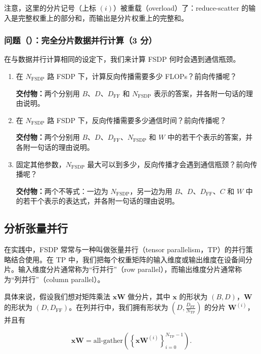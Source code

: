 注意，这里的分片记号（上标 $(i)$）被重载（overload）了：reduce-scatter 的输入是完整权重上的部分和，而输出是分片权重上的完整和。

\subsubsection*{问题（）：完全分片数据并行计算（3 分）}

在与数据并行计算相同的设定下，我们来计算 FSDP 何时会遇到通信瓶颈。

\begin{enumerate}[label=(\alph*)]
  \item 在 $N_{\mathrm{FSDP}}$ 路 FSDP 下，计算反向传播需要多少 FLOPs？前向传播呢？

  \textbf{交付物：}两个分别用 $B$、$D$、$D_{\mathrm{FF}}$ 和 $N_{\mathrm{FSDP}}$ 表示的答案，并各附一句话的理由说明。

  \item 在 $N_{\mathrm{FSDP}}$ 路 FSDP 下，反向传播需要多少通信时间？前向传播呢？

  \textbf{交付物：}两个分别用 $B$、$D$、$D_{\mathrm{FF}}$、$N_{\mathrm{FSDP}}$ 和 $W$ 中的若干个表示的答案，并各附一句话的理由说明。

  \item 固定其他参数，$N_{\mathrm{FSDP}}$ 最大可以到多少，反向传播才会遇到通信瓶颈？前向传播呢？

  \textbf{交付物：}两个不等式：一边为 $N_{\mathrm{FSDP}}$，另一边为用 $B$、$D$、$D_{\mathrm{FF}}$、$C$ 和 $W$ 中的若干个表示的表达式，并各附一句话的理由说明。
\end{enumerate}

\subsection{分析张量并行}

在实践中，FSDP 常常与一种叫做张量并行（tensor parallelism，TP）的并行策略结合使用。在 TP 中，我们把每个权重矩阵的输入维度或输出维度在设备间分片。输入维度分片通常称为“行并行”（row parallel），而输出维度分片通常称为“列并行”（column parallel）。

具体来说，假设我们想对矩阵乘法 $\boldsymbol{x}\boldsymbol{W}$ 做分片，其中 $\boldsymbol{x}$ 的形状为 $(B,D)$，$\boldsymbol{W}$ 的形状为 $(D,D_{\mathrm{FF}})$。在列并行中，我们拥有形状为 $\left(D,\frac{D_{\mathrm{FF}}}{N_{\mathrm{TP}}}\right)$ 的分片 $\boldsymbol{W}^{(i)}$，并且有

\begin{equation}
\boldsymbol{x}\boldsymbol{W} = \text{all-gather}\left(\left\{\boldsymbol{x}\boldsymbol{W}^{(i)}\right\}_{i=0}^{N_{\mathrm{TP}}-1}\right).
\tag{45}
\end{equation}


